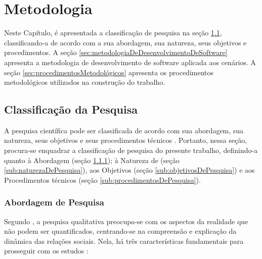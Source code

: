 \chapter{Metodologia}
\label{chap:metodologia}

Neste Capítulo, é apresentada a classificação de pesquisa na seção \ref{sec:classificacaoDaPesquisa}, classificando-a de acordo com a sua abordagem, sua natureza, seus objetivos e procedimentos. A seção \ref{sec:metodologiaDeDesenvolvimentoDeSoftware} apresenta a metodologia de desenvolvimento de software aplicada aos cenários. A seção \ref{sec:procedimentosMetodológicos} apresenta os procedimentos metodológicos utilizados na construção do trabalho.

  

\section{Classificação da Pesquisa}
\label{sec:classificacaoDaPesquisa}

A pesquisa científica pode ser classificada de acordo com sua abordagem, sua natureza, seus objetivos e seus procedimentos técnicos \cite{gerhardt2009metodos}. Portanto, nessa seção, procura-se enquadrar a classificação de pesquisa do presente trabalho, definindo-a quanto à Abordagem (seção \ref{sub:abordagemDePesquisa}); à Natureza de (seção \ref{sub:naturezaDePesquisa}), aos Objetivos (seção \ref{sub:objetivosDePesquisa}) e aos Procedimentos técnicos (seção \ref{sub:procedimentosDePesquisa}).

\subsection{Abordagem de Pesquisa}
\label{sub:abordagemDePesquisa}

Segundo \cite{gerhardt2009metodos}, a pesquisa qualitativa preocupa-se com os aspectos da realidade que não podem ser quantificados, centrando-se na compreensão e explicação da dinâmica das relações sociais. Nela, há três características fundamentais para prosseguir com os estudos \cite{mazzotti1991planejamento}:

